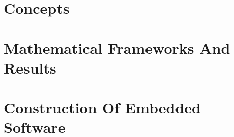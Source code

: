 \documentclass[letterpaper,10pt,titlepage]{custbook}
\begin{document}
%

%

%
\vspace{-0.45in}
%
\frontmatter{}
%

%

%
\tableofcontents
%
\listoftables
%
\listoffigures
%
\listofalgorithms
%
\mainmatter{}
%
\part{Concepts}





\part{Mathematical Frameworks And Results}















\part{Construction Of Embedded Software}




\end{document}
